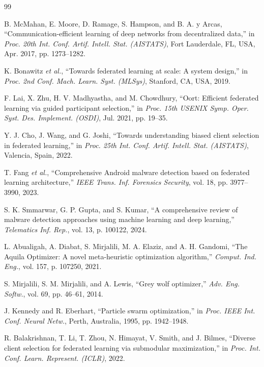 \documentclass[conference]{IEEEtran}
\begin{document}

\begin{thebibliography}{99}

B. McMahan, E. Moore, D. Ramage, S. Hampson, and B. A. y Arcas, ``Communication-efficient learning of deep networks from decentralized data,'' in \emph{Proc. 20th Int. Conf. Artif. Intell. Stat. (AISTATS)}, Fort Lauderdale, FL, USA, Apr. 2017, pp. 1273--1282.

K. Bonawitz \emph{et al.}, ``Towards federated learning at scale: A system design,'' in \emph{Proc. 2nd Conf. Mach. Learn. Syst. (MLSys)}, Stanford, CA, USA, 2019.

F. Lai, X. Zhu, H. V. Madhyastha, and M. Chowdhury, ``Oort: Efficient federated learning via guided participant selection,'' in \emph{Proc. 15th USENIX Symp. Oper. Syst. Des. Implement. (OSDI)}, Jul. 2021, pp. 19--35.

Y. J. Cho, J. Wang, and G. Joshi, ``Towards understanding biased client selection in federated learning,'' in \emph{Proc. 25th Int. Conf. Artif. Intell. Stat. (AISTATS)}, Valencia, Spain, 2022.

T. Fang \emph{et al.}, ``Comprehensive Android malware detection based on federated learning architecture,'' \emph{IEEE Trans. Inf. Forensics Security}, vol. 18, pp. 3977--3990, 2023.

S. K. Smmarwar, G. P. Gupta, and S. Kumar, ``A comprehensive review of malware detection approaches using machine learning and deep learning,'' \emph{Telematics Inf. Rep.}, vol. 13, p. 100122, 2024.

L. Abualigah, A. Diabat, S. Mirjalili, M. A. Elaziz, and A. H. Gandomi, ``The Aquila Optimizer: A novel meta-heuristic optimization algorithm,'' \emph{Comput. Ind. Eng.}, vol. 157, p. 107250, 2021.

S. Mirjalili, S. M. Mirjalili, and A. Lewis, ``Grey wolf optimizer,'' \emph{Adv. Eng. Softw.}, vol. 69, pp. 46--61, 2014.

J. Kennedy and R. Eberhart, ``Particle swarm optimization,'' in \emph{Proc. IEEE Int. Conf. Neural Netw.}, Perth, Australia, 1995, pp. 1942--1948.

R. Balakrishnan, T. Li, T. Zhou, N. Himayat, V. Smith, and J. Bilmes, ``Diverse client selection for federated learning via submodular maximization,'' in \emph{Proc. Int. Conf. Learn. Represent. (ICLR)}, 2022.


\end{thebibliography}
\end{document}
